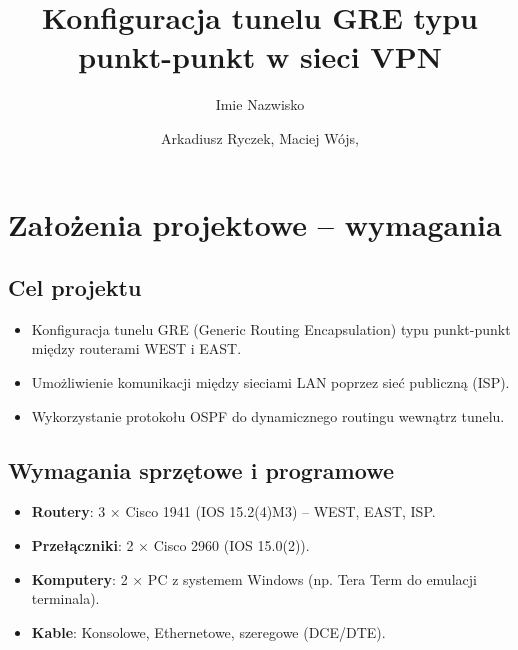 \documentclass[12pt,twoside,a4paper,openany]{article}
\title{Konfiguracja tunelu GRE typu punkt-punkt w sieci VPN}		%
\author{Imie Nazwisko}
\author{Arkadiusz Ryczek, Maciej Wójs,  }
\begin{document}
\renewcommand{\figurename}{Rys.}    %
\renewcommand{\tablename}{Tab.}     %
\thispagestyle{empty}               %
\stronatytulowa                     %


\pagestyle{fancy}
\newpage

\renewcommand{\cftbeforesecskip}{8pt}
\renewcommand{\cftsecafterpnum}{\vskip 8pt}
\renewcommand{\cftparskip}{3pt}
\renewcommand{\cfttoctitlefont}{\Large\bfseries\sffamily}
\renewcommand{\cftsecfont}{\bfseries\sffamily}
\renewcommand{\cftsubsecfont}{\sffamily}
\renewcommand{\cftsubsubsecfont}{\sffamily}
\renewcommand{\cftparafont}{\sffamily}

\tableofcontents    %
\thispagestyle{fancy}
\newpage

\section{Założenia projektowe – wymagania}

\subsection{Cel projektu}
\begin{itemize}
    \item Konfiguracja tunelu GRE (Generic Routing Encapsulation) typu punkt-punkt między routerami WEST i EAST.
    \item Umożliwienie komunikacji między sieciami LAN poprzez sieć publiczną (ISP).
    \item Wykorzystanie protokołu OSPF do dynamicznego routingu wewnątrz tunelu.
\end{itemize}

\subsection{Wymagania sprzętowe i programowe}
\begin{itemize}
    \item \textbf{Routery}: 3 × Cisco 1941 (IOS 15.2(4)M3) – WEST, EAST, ISP.
    \item \textbf{Przełączniki}: 2 × Cisco 2960 (IOS 15.0(2)).
    \item \textbf{Komputery}: 2 × PC z systemem Windows (np. Tera Term do emulacji terminala).
    \item \textbf{Kable}: Konsolowe, Ethernetowe, szeregowe (DCE/DTE).
\end{itemize}
\end{document}
